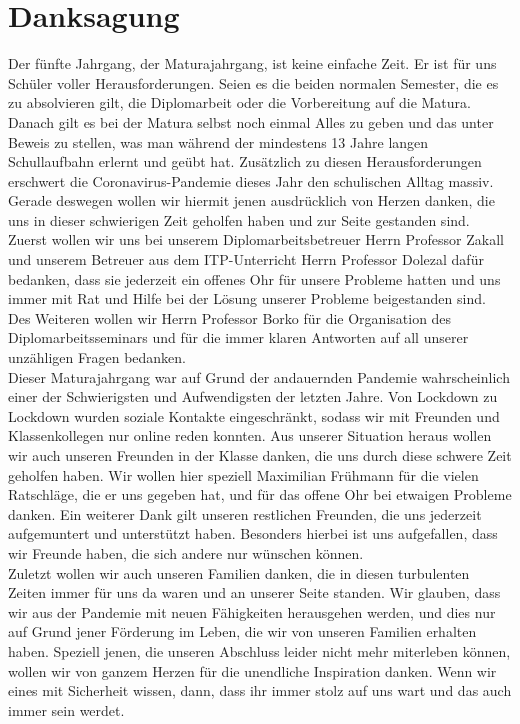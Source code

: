 \chapter{Danksagung} 
Der fünfte Jahrgang, der Maturajahrgang, ist keine einfache Zeit. Er ist für uns Schüler voller Herausforderungen. Seien es die beiden normalen Semester, die es zu absolvieren gilt, die Diplomarbeit oder die Vorbereitung auf die Matura. Danach gilt es bei der Matura selbst noch einmal Alles zu geben und das unter Beweis zu stellen, was man während der mindestens 13 Jahre langen Schullaufbahn erlernt und geübt hat. Zusätzlich zu diesen Herausforderungen erschwert die Coronavirus-Pandemie dieses Jahr den schulischen Alltag massiv. Gerade deswegen wollen wir hiermit jenen ausdrücklich von Herzen danken, die uns in dieser schwierigen Zeit geholfen haben und zur Seite gestanden sind.\\

Zuerst wollen wir uns bei unserem Diplomarbeitsbetreuer Herrn Professor Zakall und unserem Betreuer aus dem ITP-Unterricht Herrn Professor Dolezal dafür bedanken, dass sie jederzeit ein offenes Ohr für unsere Probleme hatten und uns immer mit Rat und Hilfe bei der Lösung unserer Probleme beigestanden sind. Des Weiteren wollen wir Herrn Professor Borko für die Organisation des Diplomarbeitsseminars und für die immer klaren Antworten auf all unserer unzähligen Fragen bedanken.\\

Dieser Maturajahrgang war auf Grund der andauernden Pandemie wahrscheinlich einer der Schwierigsten und Aufwendigsten der letzten Jahre. Von Lockdown zu Lockdown wurden soziale Kontakte eingeschränkt, sodass wir mit Freunden und Klassenkollegen nur online reden konnten. Aus unserer Situation heraus wollen wir auch unseren Freunden in der Klasse danken, die uns durch diese schwere Zeit geholfen haben. Wir wollen hier speziell Maximilian Frühmann für die vielen Ratschläge, die er uns gegeben hat, und für das offene Ohr bei etwaigen Probleme danken. Ein weiterer Dank gilt unseren restlichen Freunden, die uns jederzeit aufgemuntert und unterstützt haben. Besonders hierbei ist uns aufgefallen, dass wir Freunde haben, die sich andere nur wünschen können.\\

Zuletzt wollen wir auch unseren Familien danken, die in diesen turbulenten Zeiten immer für uns da waren und an unserer Seite standen. Wir glauben, dass wir aus der Pandemie mit neuen Fähigkeiten herausgehen werden, und dies nur auf Grund jener Förderung im Leben, die wir von unseren Familien erhalten haben. 
Speziell jenen, die unseren Abschluss leider nicht mehr miterleben können, wollen wir von ganzem Herzen für die unendliche Inspiration danken. Wenn wir eines mit Sicherheit wissen, dann, dass ihr immer stolz auf uns wart und das auch immer sein werdet.